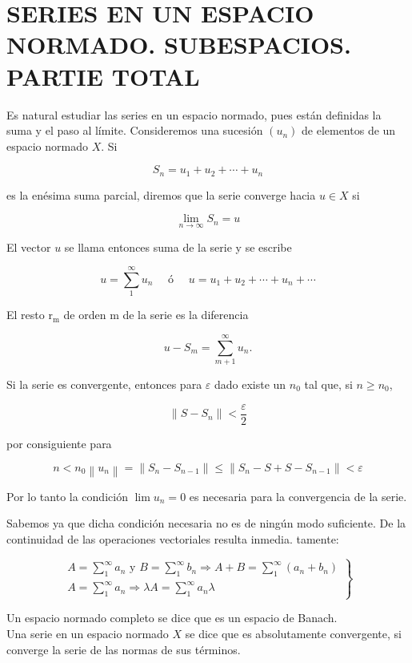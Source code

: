\documentclass[10pt]{article}
\theoremstyle{plain}
\theoremstyle{definition}
\theoremstyle{remark}
\begin{document}
\section*{SERIES EN UN ESPACIO NORMADO. SUBESPACIOS. PARTIE TOTAL}
Es natural estudiar las series en un espacio normado, pues están definidas la suma y el paso al límite. Consideremos una sucesión $\left(u_{n}\right)$ de elementos de un espacio normado $X$. Si

$$
S_{n}=u_{1}+u_{2}+\cdots+u_{n}
$$

es la enésima suma parcial, diremos que la serie converge hacia $u \in X$ si

$$
\lim _{n \rightarrow \infty} S_{n}=u
$$

El vector $u$ se llama entonces suma de la serie y se escribe

$$
u=\sum_{1}^{\infty} u_{n} \quad \text { ó } \quad u=u_{1}+u_{2}+\cdots+u_{n}+\cdots
$$

El resto $\mathrm{r}_{\mathrm{m}}$ de orden m de la serie es la diferencia

$$
u-S_{m}=\sum_{m+1}^{\infty} u_{n} .
$$

Si la serie es convergente, entonces para $\varepsilon$ dado existe un $n_{0}$ tal que, si $n \geqslant n_{0}$,

$$
\left\|S-S_{n}\right\|<\frac{\varepsilon}{2}
$$

por consiguiente para

$$
n<n_{0}\left\|u_{n}\right\|=\left\|S_{n}-S_{n-1}\right\| \leqslant\left\|S_{n}-S+S-S_{n-1}\right\|<\varepsilon
$$

Por lo tanto la condición $\lim u_{n}=0$ es necesaria para la convergencia de la serie.

Sabemos ya que dicha condición necesaria no es de ningún modo suficiente. De la continuidad de las operaciones vectoriales resulta inmedia. tamente:

\[
\left.\begin{array}{l}
A=\sum_{1}^{\infty} a_{n} \text { y } B=\sum_{1}^{\infty} b_{n} \Rightarrow A+B=\sum_{1}^{\infty}\left(a_{n}+b_{n}\right)  \tag{2-3}\\
A=\sum_{1}^{\infty} a_{n} \Rightarrow \lambda A=\sum_{1}^{\infty} a_{n} \lambda
\end{array}\right\}
\]

Un espacio normado completo se dice que es un espacio de Banach.\\
Una serie en un espacio normado $X$ se dice que es absolutamente convergente, si converge la serie de las normas de sus términos.
\end{document}
